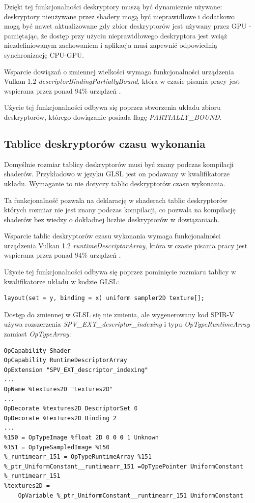 Dzięki tej funkcjonalności deskryptory muszą być dynamicznie używane: deskryptory nieużywane przez shadery mogą być nieprawidłowe i dodatkowo mogą być nawet aktualizowane gdy zbior deskryptorów jest używany przez GPU - pamiętając, że dostęp przy użyciu nieprawidłowego deskryptora jest wciąż niezdefiniowanym zachowaniem i aplikacja musi zapewnić odpowiednią synchronizację CPU-GPU.

Wsparcie dowiązań o zmiennej wielkości wymaga funkcjonalności urządzenia Vulkan 1.2 \textit{descriptorBindingPartiallyBound}, która w czasie pisania pracy jest wspierana przez ponad $94\%$ urządzeń \cite{GPUINFO}.

Użycie tej funkcjonalności odbywa się poprzez stworzenia układu zbioru deskryptorów, którego dowiązanie posiada flagę \textit{PARTIALLY\_BOUND}.

\subsection {Tablice deskryptorów czasu wykonania}

Domyślnie rozmiar tablicy deskryptorów musi być znany podczas kompilacji shaderów. Przykładowo w języku GLSL jest on podawany w kwalifikatorze układu.
Wymaganie to nie dotyczy tablic deskryptorów czasu wykonania.

Ta funkcjonalność pozwala na deklarację w shaderach tablic deskryptorów których rozmiar nie jest znany podczas kompilacji, co pozwala na kompilację shaderów bez wiedzy o dokładnej liczbie deskryptorów w dowiązaniach.

Wsparcie tablic deskryptorów czasu wykonania wymaga funkcjonalności urządzenia Vulkan 1.2 \textit{runtimeDescriptorArray}, która w czasie pisania pracy jest wspierana przez ponad $94\%$ urządzeń \cite{GPUINFO}.

Użycie tej funkcjonalności odbywa się poprzez pominięcie rozmiaru tablicy w kwalifikatorze układu w kodzie GLSL:
\lstset{language=GLSL}
\begin{lstlisting}
layout(set = y, binding = x) uniform sampler2D texture[];
\end{lstlisting}
Dostęp do zmiennej w GLSL się nie zmienia, ale wygenerowany kod SPIR-V używa rozszerzenia \textit{SPV\_EXT\_descriptor\_indexing} i typu \textit{OpTypeRuntimeArray} zamiast \textit{OpTypeArray}:
\lstset{language=SPIRV}
\begin{lstlisting}
OpCapability Shader
OpCapability RuntimeDescriptorArray
OpExtension "SPV_EXT_descriptor_indexing"
...
OpName %textures2D "textures2D"
...
OpDecorate %textures2D DescriptorSet 0
OpDecorate %textures2D Binding 2
...
%150 = OpTypeImage %float 2D 0 0 0 1 Unknown
%151 = OpTypeSampledImage %150
%_runtimearr_151 = OpTypeRuntimeArray %151
%_ptr_UniformConstant__runtimearr_151 =OpTypePointer UniformConstant %_runtimearr_151
%textures2D =
	OpVariable %_ptr_UniformConstant__runtimearr_151 UniformConstant
\end{lstlisting}

